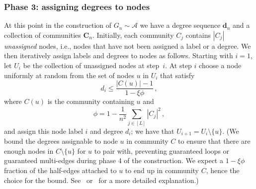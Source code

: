 \documentclass[12pt]{article}
\theoremstyle{definition}
\theoremstyle{remark}
\theoremstyle{remark}
\numberwithin{theorem}{section}
\newcommand{\abcdDist}{\ensuremath{\mathcal{A}}}
\begin{document}
\subsubsection*{Phase 3: assigning degrees to nodes}
At this point in the construction of $G_n \sim \abcdDist$ we have a degree sequence $\textbf{d}_n$ and a collection of communities $\textbf{C}_n$. Initially, each community $C_j$ contains $|C_j|$ \textit{unassigned} nodes, i.e., nodes that have not been assigned a label or a degree. We then iteratively assign labels and degrees to nodes as follows. Starting with $i=1$, let $U_i$ be the collection of unassigned nodes at step~$i$. At step $i$ choose a node uniformly at random from the set of nodes $u$ in $U_i$ that satisfy 
\[
d_i \leq \frac{|C(u)|-1}{1-\xi \phi} \,,
\]
where $C(u)$ is the community containing $u$ and
\[
\phi = 1 - \frac{1}{n^2} \sum_{j \in [L]} | C_j |^2 \,,
\]
and assign this node label $i$ and degree $d_i$; we have that $U_{i+1} = U_i \setminus \{u\}$. (We bound the degrees assignable to node $u$ in community $C$ to ensure that there are enough nodes in $C \setminus\{u\}$ for $u$ to pair with, preventing guaranteed loops or guaranteed multi-edges during phase 4 of the construction. We expect a $1-\xi \phi$ fraction of the half-edges attached to $u$ to end up in community $C$, hence the choice for the bound. See~\cite{kaminski2022modularity} or~\cite{kaminski2021artificial} for a more detailed explanation.)
\end{document}

